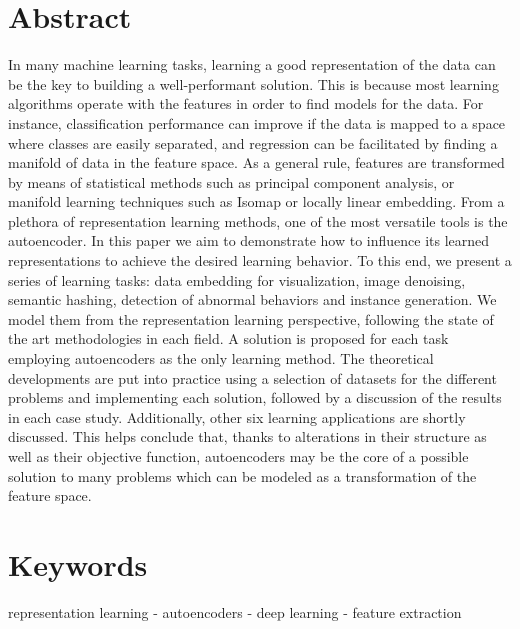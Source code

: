 \documentclass[
	fontsize=11pt, %
	twoside=false, %
	open=any, %
	secnumdepth=1, %
]{kaobook}
\begin{document}
\section*{Abstract}
In many machine learning tasks, learning a good representation of the data can be the key to building a well-performant solution. This is because most learning algorithms operate with the features in order to find models for the data. For instance, classification performance can improve if the data is mapped to a space where classes are easily separated, and regression can be facilitated by finding a manifold of data in the feature space. As a general rule, features are transformed by means of statistical methods such as principal component analysis, or manifold learning techniques such as Isomap or locally linear embedding. From a plethora of representation learning methods, one of the most versatile tools is the autoencoder. In this paper we aim to demonstrate how to influence its learned representations to achieve the desired learning behavior. To this end, we present a series of learning tasks: data embedding for visualization, image denoising, semantic hashing, detection of abnormal behaviors and instance generation. We model them from the representation learning perspective, following the state of the art methodologies in each field. A solution is proposed for each task employing autoencoders as the only learning method. The theoretical developments are put into practice using a selection of datasets for the different problems and implementing each solution, followed by a discussion of the results in each case study. Additionally, other six learning applications are shortly discussed. This helps conclude that, thanks to alterations in their structure as well as their objective function, autoencoders may be the core of a possible solution to many problems which can be modeled as a transformation of the feature space.

  \section*{Keywords}
representation learning -  autoencoders - deep learning - feature extraction


\end{document}
